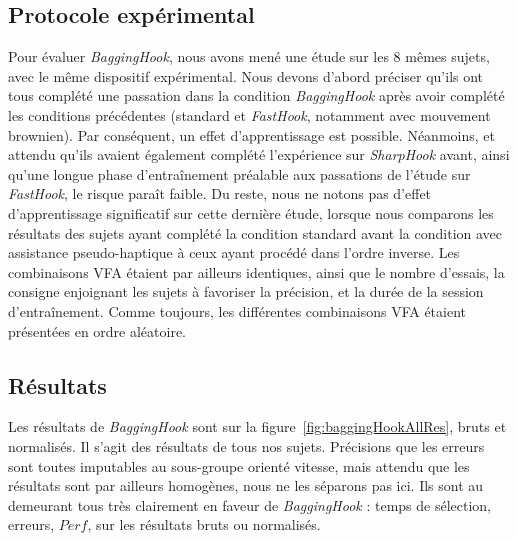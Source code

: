 	\subsection{Protocole expérimental}
	Pour évaluer \emph{BaggingHook}, nous avons mené une étude sur les 8 mêmes sujets, avec le même dispositif expérimental. Nous devons d'abord préciser qu'ils ont tous complété une passation dans la condition \emph{BaggingHook} après avoir complété les conditions précédentes (standard et \emph{FastHook}, notamment avec mouvement brownien). Par conséquent, un effet d'apprentissage est possible. Néanmoins, et attendu qu'ils avaient également complété l'expérience sur \emph{SharpHook} avant, ainsi qu'une longue phase d'entraînement préalable aux passations de l'étude sur \emph{FastHook}, le risque paraît faible. Du reste, nous ne notons pas d'effet d'apprentissage significatif sur cette dernière étude, lorsque nous comparons les résultats des sujets ayant complété la condition standard avant la condition avec assistance pseudo-haptique à ceux ayant procédé dans l'ordre inverse. Les combinaisons VFA étaient par ailleurs identiques, ainsi que le nombre d'essais, la consigne enjoignant les sujets à favoriser la précision, et la durée de la session d'entraînement. Comme toujours, les différentes combinaisons VFA étaient présentées en ordre aléatoire.
	
	\subsection{Résultats}
	Les résultats de \emph{BaggingHook} sont sur la figure~\ref{fig:baggingHookAllRes}, bruts et normalisés. Il s'agit des résultats de tous nos sujets. Précisions que les erreurs sont toutes imputables au sous-groupe orienté vitesse, mais attendu que les résultats sont par ailleurs homogènes, nous ne les séparons pas ici. Ils sont au demeurant tous très clairement en faveur de \emph{BaggingHook} : temps de sélection, erreurs, $Perf$, sur les résultats bruts ou normalisés.	
	

